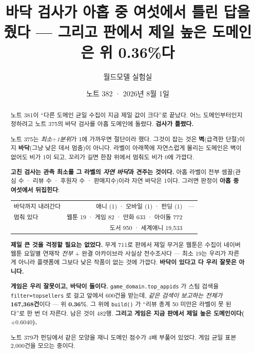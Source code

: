 \documentclass[11pt]{article}
\begin{document}
\title{바닥 검사가 아홉 중 여섯에서 틀린 답을 줬다 --- 그리고 판에서 제일 높은 도메인은 위 0.36\%다}
\author{월드모델 실험실}
\date{노트 382 · 2026년 8월 1일}
\maketitle

\begin{abstract}
노트 381이 ``다른 도메인 균일 수집이 지금 제일 값이 크다''로 끝났다.
어느 도메인부터인지 정하려고 노트 375의 바닥 검사를 아홉 도메인에 돌렸다.
\textbf{검사가 틀렸다.}

노트 375는 \emph{최소$\div$1분위}가 1에 가까우면 절단이라 했다. 그것이
잡는 것은 \textbf{벽}(급격한 단절)이지 \textbf{바닥}(그냥 낮은 데서 멈춤)이
아니다. 라벨이 아래쪽에 자연스럽게 몰리는 도메인은 벽이 없어도 비가 1이
되고, 꼬리가 길면 한참 위에서 멈춰도 비가 0에 가깝다.

\textbf{고친 검사는 관측 최소를 그 라벨의 \emph{자연 바닥}과 견주는 것이다.}
아홉 라벨이 전부 셈꼴(관심 수 · 리뷰 수 · 후원자 수 · 판매지수)이라 자연
바닥은 1이다. 그러면 판정이 \textbf{아홉 중 여섯에서 뒤집힌다}:

\begin{center}
\begin{tabular}{lrr}
\hline
바닥까지 내려간다 & 애니 (1) · 모바일 (1) · 펀딩 (1) & --- \\
멈춰 있다 & 웹툰 19 · 게임 82 · 만화 633 · 아이돌 772 & \\
 & 도서 950 · 세계애니 19,533 & \\
\hline
\end{tabular}
\end{center}

\textbf{제일 큰 것을 걱정할 필요는 없었다.} 무게 711로 판에서 제일 무거운
웹툰은 수집이 네이버 웹툰 요일별 연재작 \emph{전부} $+$ 완결 아카이브라
사실상 전수조사다 --- 최소 19는 우리가 자른 게 아니라 플랫폼에 그보다
낮은 작품이 없는 것에 가깝다. \textbf{바닥이 있다고 다 우리 잘못은 아니다.}

\textbf{게임은 우리 잘못이고, 바닥이 둘이다.}
\texttt{game\_domain.top\_appids} 가 스팀 검색을 \texttt{filter=topsellers}
로 걸고 앞에서 600건을 받는데, \emph{같은 검색이 보고하는 전체가}
\textbf{167,368건}이다 --- 위 \textbf{0.36\%}. 그 위에 \texttt{build()} 가
``리뷰 총계 50 미만은 라벨이 못 된다''로 한 번 더 자른다. 남은 것이 482행.
\textbf{그리고 게임은 지금 판에서 제일 높은 도메인이다($+0.6040$).}

노트 379가 펀딩에서 같은 모양을 재니 도메인 점수가 4배 부풀어 있었다.
게임 균일 표본 2,000건을 모으는 중이다.
\end{abstract}
\end{document}
